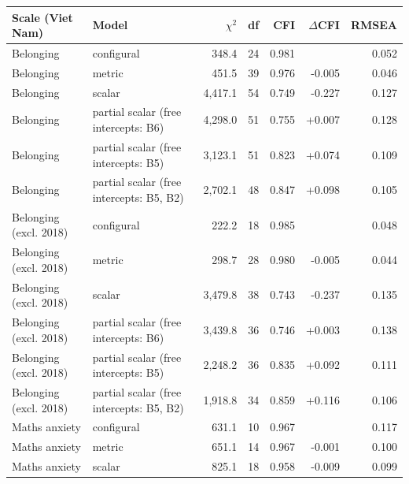 \begin{tabular}{@{}llrrrrr@{}}
\toprule
Scale (Viet Nam) & Model & $\chi^2$ & df & CFI & $\Delta$CFI & RMSEA \\
\midrule
Belonging & configural & 348.4 & 24 & 0.981 &  & 0.052 \\
Belonging & metric & 451.5 & 39 & 0.976 & -0.005 & 0.046 \\
Belonging & scalar & 4,417.1 & 54 & 0.749 & -0.227 & 0.127 \\
Belonging & partial scalar (free intercepts: B6) & 4,298.0 & 51 & 0.755 & +0.007 & 0.128 \\
Belonging & partial scalar (free intercepts: B5) & 3,123.1 & 51 & 0.823 & +0.074 & 0.109 \\
Belonging & partial scalar (free intercepts: B5, B2) & 2,702.1 & 48 & 0.847 & +0.098 & 0.105 \\
Belonging (excl. 2018) & configural & 222.2 & 18 & 0.985 &  & 0.048 \\
Belonging (excl. 2018) & metric & 298.7 & 28 & 0.980 & -0.005 & 0.044 \\
Belonging (excl. 2018) & scalar & 3,479.8 & 38 & 0.743 & -0.237 & 0.135 \\
Belonging (excl. 2018) & partial scalar (free intercepts: B6) & 3,439.8 & 36 & 0.746 & +0.003 & 0.138 \\
Belonging (excl. 2018) & partial scalar (free intercepts: B5) & 2,248.2 & 36 & 0.835 & +0.092 & 0.111 \\
Belonging (excl. 2018) & partial scalar (free intercepts: B5, B2) & 1,918.8 & 34 & 0.859 & +0.116 & 0.106 \\
Maths anxiety & configural & 631.1 & 10 & 0.967 &  & 0.117 \\
Maths anxiety & metric & 651.1 & 14 & 0.967 & -0.001 & 0.100 \\
Maths anxiety & scalar & 825.1 & 18 & 0.958 & -0.009 & 0.099 \\
\bottomrule
\end{tabular}
